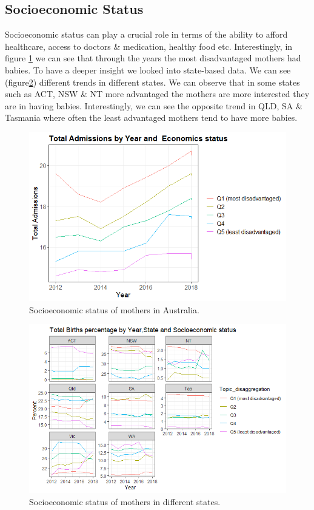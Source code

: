 \subsection{Socioeconomic Status}
Socioeconomic status can play a crucial role in terms of the ability to afford healthcare, access to doctors \& medication, healthy food etc. Interestingly, in figure \ref{fig:socioecoau} we can see that through the years the most disadvantaged mothers had babies. To have a deeper insight we looked into state-based data. We can see (figure\ref{fig:socioecostates}) different trends in different states. We can observe that in some states such as ACT, NSW \& NT more advantaged the mothers are more interested they are in having babies. Interestingly, we can see the opposite trend in QLD, SA \& Tasmania where often the least advantaged mothers tend to have more babies.

\begin{figure}
  \centering
  \includegraphics[width=1\textwidth]{subsections/socioeco/economic_status_au.png}
  \caption{Socioeconomic status of mothers in Australia.}
  \label{fig:socioecoau}
\end{figure}

\begin{figure}
  \centering
  \includegraphics[width=1\textwidth]{subsections/socioeco/socio_economic.png}
  \caption{Socioeconomic status of mothers in different states.}
  \label{fig:socioecostates}
\end{figure}